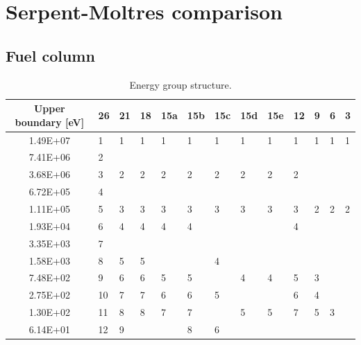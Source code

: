 \documentclass[11pt,letterpaper]{article}
\begin{document}
\section{Serpent-Moltres comparison}

\subsection{Fuel column}

\begin{table}[htbp!]
  \centering
  \caption{Energy group structure.}
  \begin{tabular}{c|l|l|l|l|l|l|l|l|l|l|l|l}
  \toprule
  Upper boundary [eV] & 26    & 21   & 18   & 15a & 15b & 15c & 15d & 15e   & 12  & 9  & 6  & 3 \\
  \midrule
  1.49E+07            & 1     & 1    & 1    & 1   & 1   & 1   & 1   & 1     & 1   & 1  & 1  & 1 \\ \cline{1-2}
  7.41E+06            & 2     &      &      &     &     &     &     &       &     &    &    &   \\ \cline{1-10}
  3.68E+06            & 3     & 2    & 2    & 2   & 2   & 2   & 2   & 2     & 2   &    &    &   \\ \cline{1-2}
  6.72E+05            & 4     &      &      &     &     &     &     &       &     &    &    &   \\ \hline
  1.11E+05            & 5     & 3    & 3    & 3   & 3   & 3   & 3   & 3     & 3   & 2  & 2  & 2 \\ \cline{1-6} \cline{10-10}
  1.93E+04            & 6     & 4    & 4    & 4   & 4   &     &     &       & 4   &    &    &   \\ \cline{1-2}
  3.35E+03            & 7     &      &      &     &     &     &     &       &     &    &    &   \\ \cline{1-4} \cline{7-7}
  1.58E+03            & 8     & 5    & 5    &     &     & 4   &     &       &     &    &    &   \\ \cline{1-6} \cline{8-11}
  7.48E+02            & 9     & 6    & 6    & 5   & 5   &     & 4   & 4     & 5   & 3  &    &   \\ \cline{1-7} \cline{10-11}
  2.75E+02            & 10    & 7    & 7    & 6   & 6   & 5   &     &       & 6   & 4  &    &   \\ \cline{1-6} \cline{8-12}
  1.30E+02            & 11    & 8    & 8    & 7   & 7   &     & 5   & 5     & 7   & 5  & 3  &   \\ \cline{1-3} \cline{6-7}
  6.14E+01            & 12    & 9    &      &     & 8   & 6   &     &       &     &    &    &   \\ \cline{1-6} \cline{8-9}

\end{tabular}
\end{table}
\end{document}
